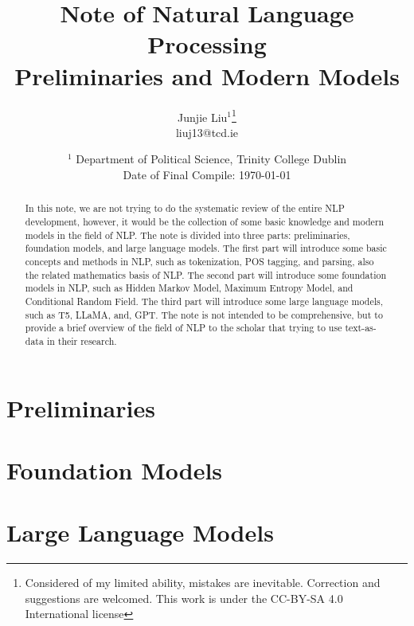 \documentclass[10pt, a4paper]{article}
\title{Note of Natural Language Processing \\[1ex] { Preliminaries and Modern Models}}
\author{Junjie Liu$^1$\thanks{ Considered of my limited ability, mistakes are inevitable. Correction and suggestions are welcomed. This work is under the CC-BY-SA 4.0 International license} \\ liuj13@tcd.ie}
\date{\small $^1$ Department of Political Science, Trinity College Dublin \\ \vspace{0.1in} Date of Final Compile: \today}
\begin{document}
\maketitle
\tableofcontents
\clearpage
\restoregeometry

\begin{abstract}
In this note, we are not trying to do the systematic review of the entire NLP development, however, it would be the collection of
some basic knowledge and modern models in the field of NLP. The note is divided into three parts: preliminaries, foundation models, and large language models. The first part will introduce some basic concepts and methods in NLP, such as tokenization, POS tagging, and parsing, also the related mathematics basis of NLP. The second part will introduce some foundation models in NLP, such as Hidden Markov Model, Maximum Entropy Model, and Conditional Random Field. The third part will introduce some large language models, such as T5, LLaMA, and, GPT. The note is not intended to be comprehensive, but to provide a brief overview of the field of NLP to the scholar that trying to use text-as-data in their research. 
\end{abstract}


\newpage
\section{Preliminaries}

\section{Foundation Models}

\section{Large Language Models}




\printindex
\restoregeometry
\end{document}

